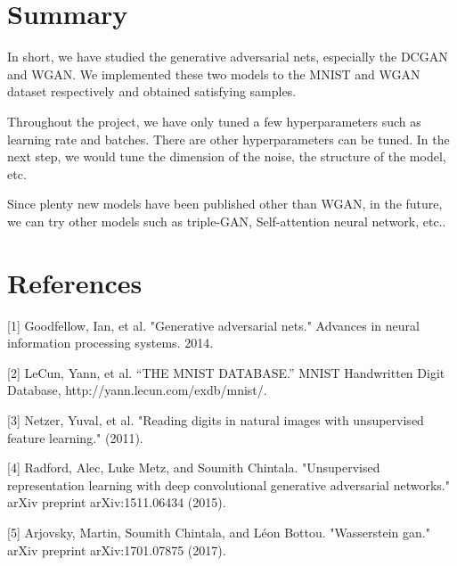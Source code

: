 \documentclass{article}
\begin{document}
\section{Summary}

In short, we have studied the generative adversarial nets, especially the DCGAN and WGAN. We implemented these two models to the MNIST and WGAN dataset respectively and obtained satisfying samples.

Throughout the project, we have only tuned a few hyperparameters such as learning rate and batches. There are other hyperparameters can be tuned. In the next step, we would tune the dimension of the noise, the structure of the model, etc.

Since plenty new models have been published other than WGAN, in the future, we can try other models such as triple-GAN, Self-attention neural network, etc..

\section*{References}

[1] Goodfellow, Ian, et al. "Generative adversarial nets." Advances in neural information processing systems. 2014.

[2] LeCun, Yann, et al. “THE MNIST DATABASE.” MNIST Handwritten Digit Database, http://yann.lecun.com/exdb/mnist/.

[3] Netzer, Yuval, et al. "Reading digits in natural images with unsupervised feature learning." (2011).

[4] Radford, Alec, Luke Metz, and Soumith Chintala. "Unsupervised representation learning with deep convolutional generative adversarial networks." arXiv preprint arXiv:1511.06434 (2015).

[5] Arjovsky, Martin, Soumith Chintala, and Léon Bottou. "Wasserstein gan." arXiv preprint arXiv:1701.07875 (2017).
\end{document}
